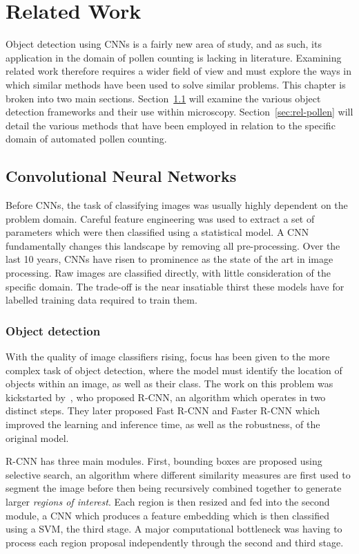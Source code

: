 \chapter{Related Work}\label{cha:related}
Object detection using CNNs is a fairly new area of study, and as such, its application in the domain of pollen counting is lacking in literature.
Examining related work therefore requires a wider field of view and must explore the ways in which similar methods have been used to solve similar problems.
This chapter is broken into two main sections.
Section~\ref{sec:rel-cnn} will examine the various object detection frameworks and their use within microscopy.
Section~\ref{sec:rel-pollen} will detail the various methods that have been employed in relation to the specific domain of automated pollen counting.

\section{Convolutional Neural Networks}\label{sec:rel-cnn}
Before CNNs, the task of classifying images was usually highly dependent on the problem domain.
Careful feature engineering was used to extract a set of parameters which were then classified using a statistical model.
A CNN fundamentally changes this landscape by removing all pre-processing.
Over the last 10 years, CNNs have risen to prominence as the state of the art in image processing.
Raw images are classified directly, with little consideration of the specific domain.
The trade-off is the near insatiable thirst these models have for labelled training data required to train them.

\subsection{Object detection}
With the quality of image classifiers rising, focus has been given to the more complex task of object detection, where the model must identify the location of objects within an image, as well as their class.
The work on this problem was kickstarted by\ \textcite{girshick_rich_2014}, who proposed R-CNN, an algorithm which operates in two distinct steps.
They later proposed Fast R-CNN and Faster R-CNN which improved the learning and inference time, as well as the robustness, of the original model.

R-CNN has three main modules.
First, bounding boxes are proposed using selective search, an algorithm where different similarity measures are first used to segment the image before then being recursively combined together to generate larger \textit{regions of interest}.
Each region is then resized and fed into the second module, a CNN which produces a feature embedding which is then classified using a SVM, the third stage.
A major computational bottleneck was having to process each region proposal independently through the second and third stage.


